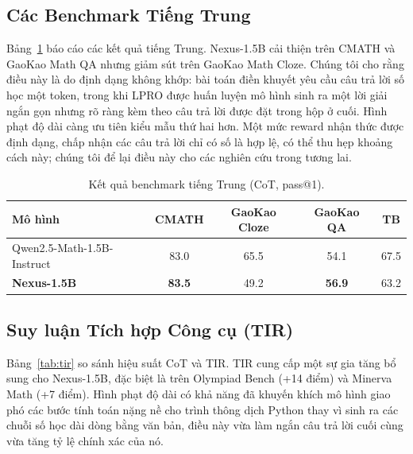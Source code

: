 \documentclass[11pt,a4paper]{article}
\begin{document}
\subsection{Các Benchmark Tiếng Trung}\label{sec:chinese}

Bảng~\ref{tab:chinese} báo cáo các kết quả tiếng Trung. Nexus-1.5B cải thiện trên CMATH và
GaoKao Math QA nhưng giảm sút trên GaoKao Math Cloze. Chúng tôi cho rằng điều này là do định dạng
không khớp: bài toán điền khuyết yêu cầu câu trả lời số học một token, trong khi LPRO được huấn luyện
mô hình sinh ra một lời giải ngắn gọn nhưng rõ ràng kèm theo câu trả lời được đặt trong hộp ở cuối.
Hình phạt độ dài càng ưu tiên kiểu mẫu thứ hai hơn. Một mức reward nhận thức được định dạng,
chấp nhận các câu trả lời chỉ có số là hợp lệ, có thể thu hẹp khoảng cách này; chúng tôi để lại điều này cho
các nghiên cứu trong tương lai.

\begin{table}[h]
\centering
\begin{tabular}{lcccc}
\toprule
\textbf{Mô hình} & \textbf{CMATH} & \textbf{GaoKao Cloze} & \textbf{GaoKao QA} & \textbf{TB} \\
\midrule
Qwen2.5-Math-1.5B-Instruct & 83.0 & 65.5 & 54.1 & 67.5 \\
\textbf{Nexus-1.5B} & \textbf{83.5} & 49.2 & \textbf{56.9} & 63.2 \\
\bottomrule
\end{tabular}
\caption{Kết quả benchmark tiếng Trung (CoT, pass@1).}
\label{tab:chinese}
\end{table}

\subsection{Suy luận Tích hợp Công cụ (TIR)}

Bảng~\ref{tab:tir} so sánh hiệu suất CoT và TIR. TIR cung cấp một sự gia tăng
bổ sung cho Nexus-1.5B, đặc biệt là trên Olympiad Bench (+14 điểm) và Minerva Math
(+7 điểm). Hình phạt độ dài có khả năng đã khuyến khích mô hình giao phó
các bước tính toán nặng nề cho trình thông dịch Python thay vì sinh ra các chuỗi số học
dài dòng bằng văn bản, điều này vừa làm ngắn câu trả lời cuối cùng vừa tăng tỷ lệ
chính xác của nó.
\end{document}
